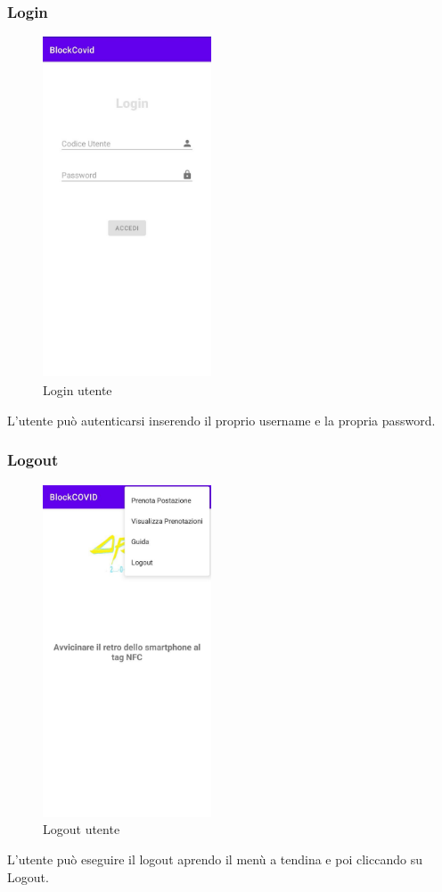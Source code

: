 \subsubsection{Login}
\begin{figure}[H]
	\centering
	\includegraphics[width=5cm]{res/images/login.png}
	\caption{Login utente}
\end{figure}
L'utente può autenticarsi inserendo il proprio username e la propria password. 

\subsubsection{Logout}
\begin{figure}[H]
	\centering
	\includegraphics[width=5cm]{res/images/menuATendina.png}
	\caption{Logout utente}
\end{figure}
L'utente può eseguire il logout aprendo il menù a tendina e poi cliccando su Logout.

